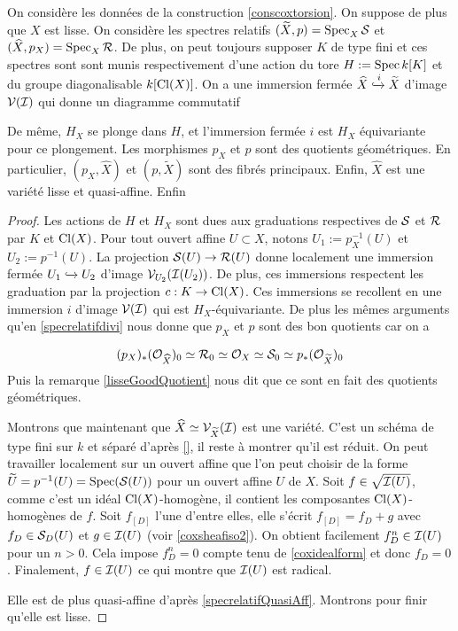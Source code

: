 \begin{cons}\label{conscoxtorsionlisse}
On considère les données de la construction \ref{conscoxtorsion}. On suppose de plus que $X$ est lisse. On considère les spectres relatifs $(\widetilde{X}, p)=\operatorname{Spec}_X \mathcal{S}$ et $(\widehat{X},p_X)=\operatorname{Spec}_X \mathcal{R}$. De plus, on peut toujours supposer $K$ de type fini et ces spectres sont sont munis respectivement d'une action du tore $H:=\operatorname{Spec} k[K]$ et du groupe diagonalisable $k[\operatorname{Cl}(X)]$. On a une immersion fermée $\widehat{X}\xhookrightarrow{i}\widetilde{X}$ d'image $\mathcal{V}(\mathcal{I})$ qui donne un diagramme commutatif

	\begin{center}
	\end{center}
De même, $H_X$ se plonge dans $H$, et l'immersion fermée $i$ est $H_X$ équivariante pour ce plongement. Les morphismes $p_X$ et $p$ sont des quotients géométriques. En particulier, $(p_X, \widehat{X})$ et $(p, \widetilde{X})$ sont des fibrés principaux. 
Enfin, $\widehat{X}$ est une variété lisse et quasi-affine.
Enfin
\end{cons}
\begin{proof}
Les actions de $H$ et $H_X$ sont dues aux graduations respectives de $\mathcal{S}$ et $\mathcal{R}$ par $K$ et $\operatorname{Cl}(X)$. Pour tout ouvert affine $U\subset X$, notons $U_1:=p_X^{-1}(U)$ et $U_2:=p^{-1}(U)$. La projection $\mathcal{S}(U)\rightarrow \mathcal{R}(U)$ donne localement une immersion fermée $U_1\xhookrightarrow{} U_2$ d'image $\mathcal{V}_{U_2}(\mathcal{I}(U_2))$. De plus, ces immersions respectent les graduation par la projection $c:K\rightarrow \operatorname{Cl}(X)$. Ces immersions se recollent en une immersion $i$ d'image $\mathcal{V}(\mathcal{I})$ qui est $H_X$-équivariante. De plus les mêmes arguments qu'en \ref{specrelatifdivi} nous donne que $p_X$ et $p$ sont des bon quotients car on a

$$(p_X)_*(\mathcal{O}_{\widehat{X}})_0\simeq \mathcal{R}_0\simeq\mathcal{O}_X\simeq\mathcal{S}_0\simeq  p_*(\mathcal{O}_{\widetilde{X}})_0$$
Puis la remarque \ref{lisseGoodQuotient} nous dit que ce sont en fait des quotients géométriques.

Montrons que maintenant que $\widehat{X}\simeq \mathcal{V}_{\widetilde{X}}(\mathcal{I})$ est une variété. C'est un schéma de type fini sur $k$ et séparé d'après \ref{}, il reste à montrer qu'il est réduit. On peut travailler localement sur un ouvert affine que l'on peut choisir de la forme $\widetilde{U}=p^{-1}(U)=\operatorname{Spec}(\mathcal{S}(U))$ pour un ouvert affine $U$ de $X$. Soit $f\in\sqrt{\mathcal{I}(U)}$, comme c'est un idéal $\operatorname{Cl}(X)$-homogène, il contient les composantes $\operatorname{Cl}(X)$-homogènes de $f$. Soit $f_{[D]}$ l'une d'entre elles, elle s'écrit $f_{[D]}=f_D+g$ avec $f_D\in \mathcal{S}_D(U)$ et $g\in\mathcal{I}(U)$ (voir \ref{coxsheafiso2}). On obtient facilement $f_D^n\in \mathcal{I}(U)$ pour un $n>0$. Cela impose $f_D^n=0$ compte tenu de \ref{coxidealform} et donc $f_D=0$. Finalement, $f\in\mathcal{I}(U)$ ce qui montre que $\mathcal{I}(U)$ est radical.

Elle est de plus quasi-affine d'après \ref{specrelatifQuasiAff}. Montrons pour finir qu'elle est lisse.
\end{proof}

